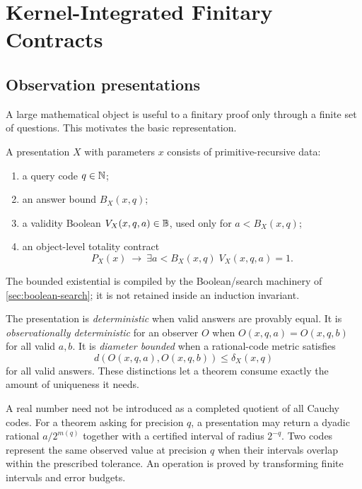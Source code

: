 \section{Kernel-Integrated Finitary Contracts}\label{sec:contracts}

\subsection{Observation presentations}

A large mathematical object is useful to a finitary proof only through a finite set of questions.  This motivates the basic representation.

\begin{definition}
A presentation \(X\) with parameters \(x\) consists of primitive-recursive data:
\begin{enumerate}[label=(\roman*)]
  \item a query code \(q\in\mathbb N\);
  \item an answer bound \(B_X(x,q)\);
  \item a validity Boolean \(V_X(x,q,a)\in\mathbb B\), used only for \(a<B_X(x,q)\);
  \item an object-level totality contract
  \[
     P_X(x)\ \longrightarrow\ \exists a<B_X(x,q)\;V_X(x,q,a)=1.
  \]
\end{enumerate}
The bounded existential is compiled by the Boolean/search machinery of \cref{sec:boolean-search}; it is not retained inside an induction invariant.
\end{definition}

The presentation is \emph{deterministic} when valid answers are provably equal.  It is \emph{observationally deterministic} for an observer \(O\) when \(O(x,q,a)=O(x,q,b)\) for all valid \(a,b\).  It is \emph{diameter bounded} when a rational-code metric satisfies
\[
 d(O(x,q,a),O(x,q,b))\leq \delta_X(x,q)
\]
for all valid answers.  These distinctions let a theorem consume exactly the amount of uniqueness it needs.

\begin{example}
A real number need not be introduced as a completed quotient of all Cauchy codes.  For a theorem asking for precision \(q\), a presentation may return a dyadic rational \(a/2^{m(q)}\) together with a certified interval of radius \(2^{-q}\).  Two codes represent the same observed value at precision \(q\) when their intervals overlap within the prescribed tolerance.  An operation is proved by transforming finite intervals and error budgets.
\end{example}

